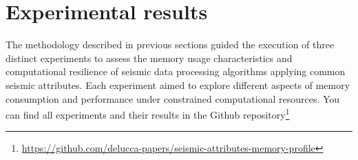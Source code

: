 \section{Experimental results}

The methodology described in previous sections guided the execution of three distinct experiments to assess the memory usage characteristics and computational resilience of seismic data processing algorithms applying common seismic attributes.
Each experiment aimed to explore different aspects of memory consumption and performance under constrained computational resources.
You can find all experiments and their results in the Github repository\footnote{\url{https://github.com/delucca-papers/seismic-attributes-memory-profile}}



